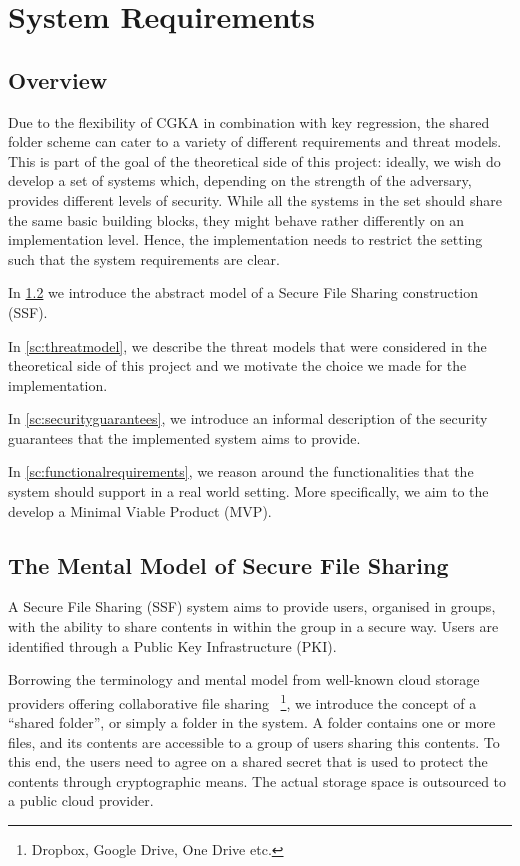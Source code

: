 \chapter{System Requirements}\label{ch:system-requirements}

\section{Overview}

Due to the flexibility of CGKA in combination with key regression, 
the shared folder scheme can cater to a variety of different requirements and threat models.
This is part of the goal of the theoretical side of this
project: ideally, we wish do develop a set of systems which, depending on the strength of the adversary,
provides different levels of security. While all the systems in the set should share the same basic building
blocks, they might behave rather differently on an implementation level. Hence, the implementation
needs to restrict the setting such that the system requirements are clear.

In \cref{sc:mentalmodel} we introduce the abstract model of a Secure File Sharing construction (SSF).

In \cref{sc:threatmodel}, we describe the threat models that were considered in the theoretical side of this project
and we motivate the choice we made for the implementation. 

In \cref{sc:securityguarantees}, we introduce an informal description of the security guarantees 
that the implemented system aims to provide.

In \cref{sc:functionalrequirements}, we reason around the functionalities that the system should support in a real world setting.
More specifically, we aim to the develop a Minimal Viable Product (MVP).

\section{The Mental Model of Secure File Sharing} \label{sc:mentalmodel}

A Secure File Sharing (SSF) system aims to provide users, organised in groups, 
with the ability to share contents in within the group in a secure way.
Users are identified through a Public Key Infrastructure (PKI).

Borrowing the terminology and mental model from well-known cloud storage providers offering collaborative file sharing
~\footnote{Dropbox, Google Drive, One Drive etc.},
we introduce the concept of a ``shared folder'', or simply a folder in the system.
A folder contains one or more files, and its contents are accessible to a group of users sharing this contents.
To this end, the users need to agree on a shared secret that is used to protect the contents through cryptographic means.
The actual storage space is outsourced to a public cloud provider.

